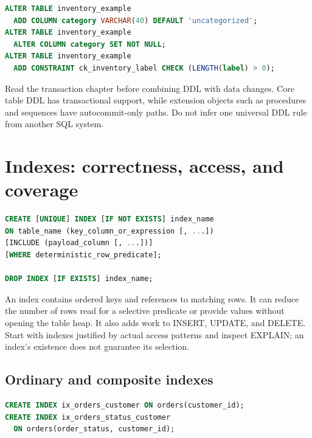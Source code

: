 \begin{lstlisting}[language=SQL]
ALTER TABLE inventory_example
  ADD COLUMN category VARCHAR(40) DEFAULT 'uncategorized';
ALTER TABLE inventory_example
  ALTER COLUMN category SET NOT NULL;
ALTER TABLE inventory_example
  ADD CONSTRAINT ck_inventory_label CHECK (LENGTH(label) > 0);
\end{lstlisting}

Read the transaction chapter before combining DDL with data changes. Core table DDL has transactional support, while extension objects such as procedures and sequences have autocommit-only paths. Do not infer one universal DDL rule from another SQL system.


\section{Indexes: correctness, access, and coverage}
\label{sql:indexes}

\begin{lstlisting}[language=SQL]
CREATE [UNIQUE] INDEX [IF NOT EXISTS] index_name
ON table_name (key_column_or_expression [, ...])
[INCLUDE (payload_column [, ...])]
[WHERE deterministic_row_predicate];

DROP INDEX [IF EXISTS] index_name;
\end{lstlisting}

An index contains ordered keys and references to matching rows. It can reduce the number of rows read for a selective predicate or provide values without opening the table heap. It also adds work to INSERT, UPDATE, and DELETE. Start with indexes justified by actual access patterns and inspect EXPLAIN; an index's existence does not guarantee its selection.

\subsection{Ordinary and composite indexes}

\begin{lstlisting}[language=SQL]
CREATE INDEX ix_orders_customer ON orders(customer_id);
CREATE INDEX ix_orders_status_customer
  ON orders(order_status, customer_id);
\end{lstlisting}

